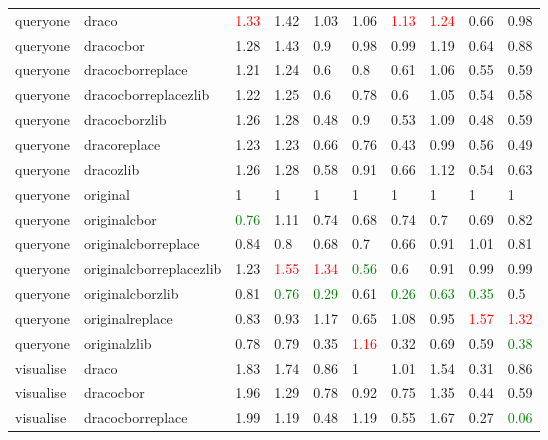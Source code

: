 \begin{landscape}
\begin{longtable}{llllllllll}
queryone & draco & \textcolor{red}{1.33} & 1.42 & 1.03 & 1.06 & \textcolor{red}{1.13} & \textcolor{red}{1.24} & 0.66 & 0.98\\
queryone & dracocbor & 1.28 & 1.43 & 0.9 & 0.98 & 0.99 & 1.19 & 0.64 & 0.88\\
queryone & dracocborreplace & 1.21 & 1.24 & 0.6 & 0.8 & 0.61 & 1.06 & 0.55 & 0.59\\
queryone & dracocborreplacezlib & 1.22 & 1.25 & 0.6 & 0.78 & 0.6 & 1.05 & 0.54 & 0.58\\
queryone & dracocborzlib & 1.26 & 1.28 & 0.48 & 0.9 & 0.53 & 1.09 & 0.48 & 0.59\\
queryone & dracoreplace & 1.23 & 1.23 & 0.66 & 0.76 & 0.43 & 0.99 & 0.56 & 0.49\\
\rowcolor{lightgray}  queryone & dracozlib & 1.26 & 1.28 & 0.58 & 0.91 & 0.66 & 1.12 & 0.54 & 0.63\\
\rowcolor{lightgray}  queryone & original & 1 & 1 & 1 & 1 & 1 & 1 & 1 & 1\\
\rowcolor{lightgray}  queryone & originalcbor & \textcolor{green}{0.76} & 1.11 & 0.74 & 0.68 & 0.74 & 0.7 & 0.69 & 0.82\\
\rowcolor{lightgray}  queryone & originalcborreplace & 0.84 & 0.8 & 0.68 & 0.7 & 0.66 & 0.91 & 1.01 & 0.81\\
\rowcolor{lightgray}  queryone & originalcborreplacezlib & 1.23 & \textcolor{red}{1.55} & \textcolor{red}{1.34} & \textcolor{green}{0.56} & 0.6 & 0.91 & 0.99 & 0.99\\
\rowcolor{lightgray}  queryone & originalcborzlib & 0.81 & \textcolor{green}{0.76} & \textcolor{green}{0.29} & 0.61 & \textcolor{green}{0.26} & \textcolor{green}{0.63} & \textcolor{green}{0.35} & 0.5\\
\rowcolor{lightgray}  queryone & originalreplace & 0.83 & 0.93 & 1.17 & 0.65 & 1.08 & 0.95 & \textcolor{red}{1.57} & \textcolor{red}{1.32}\\
\rowcolor{lightgray}  queryone & originalzlib & 0.78 & 0.79 & 0.35 & \textcolor{red}{1.16} & 0.32 & 0.69 & 0.59 & \textcolor{green}{0.38}\\
\rowcolor{lightgray}  visualise & draco & 1.83 & 1.74 & 0.86 & 1 & 1.01 & 1.54 & 0.31 & 0.86\\
\rowcolor{lightgray}  visualise & dracocbor & 1.96 & 1.29 & 0.78 & 0.92 & 0.75 & 1.35 & 0.44 & 0.59\\
\rowcolor{lightgray}  visualise & dracocborreplace & 1.99 & 1.19 & 0.48 & 1.19 & 0.55 & 1.67 & 0.27 & \textcolor{green}{0.06}\\

\end{longtable}
\end{landscape}
